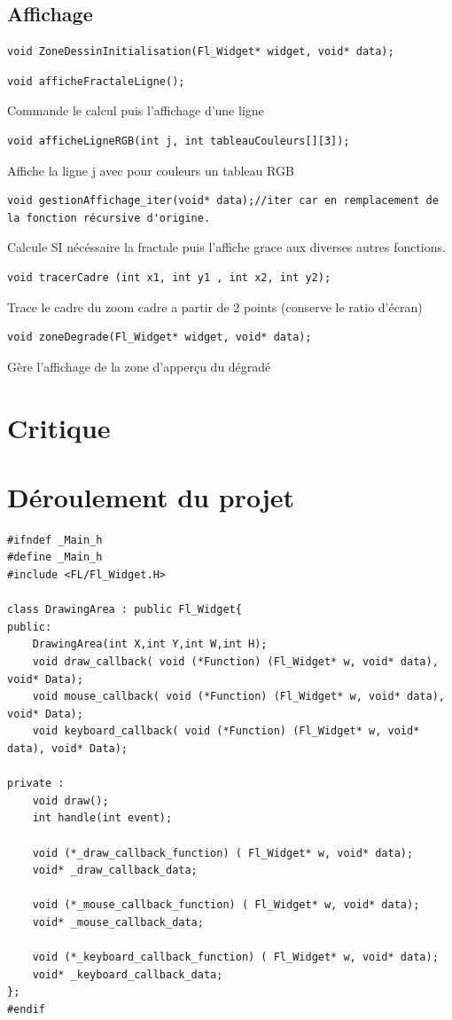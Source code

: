 \documentclass[a4paper,11pt]{article} \usepackage[T1]{fontenc} \usepackage[utf8]{inputenc} \usepackage[francais]{babel}
\begin{document}
\subsection{Affichage}
\begin{lstlisting}
void ZoneDessinInitialisation(Fl_Widget* widget, void* data);
\end{lstlisting}
\begin{lstlisting}
void afficheFractaleLigne();
\end{lstlisting}
Commande le calcul puis l'affichage d'une ligne
\begin{lstlisting}
void afficheLigneRGB(int j, int tableauCouleurs[][3]);
\end{lstlisting}
Affiche la ligne j avec pour couleurs un tableau RGB
\begin{lstlisting}
void gestionAffichage_iter(void* data);//iter car en remplacement de la fonction récursive d'origine.
\end{lstlisting}
Calcule SI nécéssaire la fractale puis l'affiche grace aux diverses autres fonctions.
\begin{lstlisting}
void tracerCadre (int x1, int y1 , int x2, int y2);
\end{lstlisting}
Trace le cadre du zoom cadre a partir de 2 points (conserve le ratio d'écran)
\begin{lstlisting}
void zoneDegrade(Fl_Widget* widget, void* data);
\end{lstlisting}
Gère l'affichage de la zone d'apperçu du dégradé



\section{Critique}
\section{Déroulement du projet}
\begin{lstlisting}
#ifndef _Main_h
#define _Main_h
#include <FL/Fl_Widget.H>

class DrawingArea : public Fl_Widget{
public:
    DrawingArea(int X,int Y,int W,int H);
    void draw_callback( void (*Function) (Fl_Widget* w, void* data), void* Data);
    void mouse_callback( void (*Function) (Fl_Widget* w, void* data), void* Data);
    void keyboard_callback( void (*Function) (Fl_Widget* w, void* data), void* Data);

private :
    void draw();
    int handle(int event);

    void (*_draw_callback_function) ( Fl_Widget* w, void* data);
    void* _draw_callback_data;

    void (*_mouse_callback_function) ( Fl_Widget* w, void* data);
    void* _mouse_callback_data;

    void (*_keyboard_callback_function) ( Fl_Widget* w, void* data);
    void* _keyboard_callback_data;
};
#endif

\end{lstlisting}
\end{document}
